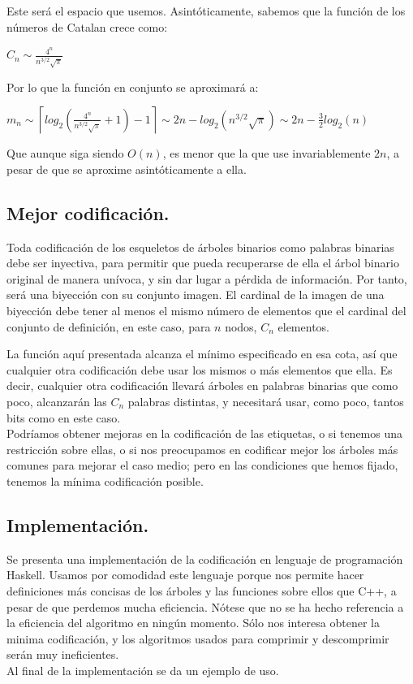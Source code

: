 \documentclass{article}
\begin{document}
Este será el espacio que usemos. Asintóticamente, sabemos que la función de los números de Catalan crece como:
\begin{adjustwidth}{2cm}{}
 $\displaystyle C_n \sim \frac{4^n}{n^{3/2}\sqrt\pi}$
\end{adjustwidth}
Por lo que la función en conjunto se aproximará a:
\begin{adjustwidth}{2cm}{}
 $\displaystyle m_n \sim \left\lceil log_2 \left( \frac{4^n}{n^{3/2}\sqrt\pi} + 1 \right) - 1 \right\rceil \sim 2n - log_2\left(n^{3/2}\sqrt\pi\right) \sim 2n - \frac{3}{2}log_2(n)$
\end{adjustwidth}
Que aunque siga siendo $O(n)$, es menor que la que use invariablemente $2n$, a pesar de que se aproxime asintóticamente a ella.

\subsection {Mejor codificación.}

Toda codificación de los esqueletos de árboles binarios como palabras binarias debe ser inyectiva, para permitir que pueda recuperarse de ella el árbol binario original de manera unívoca, y
sin dar lugar a pérdida de información. Por tanto, será una biyección con su conjunto imagen. El cardinal de la imagen de una biyección debe tener al menos el mismo número de elementos
que el cardinal del conjunto de definición, en este caso, para $n$ nodos, $C_n$ elementos.

La función aquí presentada alcanza el mínimo especificado en esa cota, así que cualquier otra codificación debe usar los mismos o más elementos que ella. Es decir, cualquier otra
codificación llevará árboles en palabras binarias que como poco, alcanzarán las $C_n$ palabras distintas, y necesitará usar, como poco, tantos bits como en este caso.\\

Podríamos obtener mejoras en la codificación de las etiquetas, o si tenemos una restricción sobre ellas, o si nos preocupamos en codificar mejor los árboles más comunes para mejorar el caso medio;
pero en las condiciones que hemos fijado, tenemos la mínima codificación posible.


\subsection {Implementación.}

Se presenta una implementación de la codificación en lenguaje de programación Haskell. Usamos por comodidad este lenguaje porque nos permite hacer definiciones más
concisas de los árboles y las funciones sobre ellos que C++, a pesar de que perdemos mucha eficiencia. Nótese que no se ha hecho referencia a la eficiencia del algoritmo en
ningún momento. Sólo nos interesa obtener la minima codificación, y los algoritmos usados para comprimir y descomprimir serán muy ineficientes.\\

Al final de la implementación se da un ejemplo de uso.\\


\end{document}
